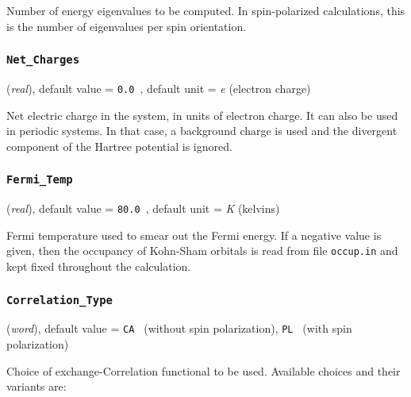 \documentclass{article}
\begin{document}
Number of energy eigenvalues to be computed. In spin-polarized calculations,
this is the number of eigenvalues per spin orientation.

\subsubsection{\tt Net\_Charges 
\label{NetCharges}}
({\it real}),
default value = {\tt 0.0 },
default unit = {\it e} (electron charge)

Net electric charge in the system, in units of electron charge. It can also
be used in periodic systems. In that case, a background charge is used
and the divergent component of the Hartree potential is ignored.

\subsubsection{\tt Fermi\_Temp 
\label{FermiTemp}}
({\it real}),
default value = {\tt 80.0 },
default unit = {\it K} (kelvins)

Fermi temperature used to smear out the Fermi energy. If a
negative value is given, then the occupancy of Kohn-Sham orbitals is read from
file {\tt occup.in} and kept fixed throughout the
calculation. 

\subsubsection{\tt Correlation\_Type 
\label{CorrelationType}}
({\it word}),
default value = {\tt CA } (without spin polarization), {\tt PL } (with
spin polarization)

Choice of exchange-Correlation functional to be used. Available
choices and their variants are:
\end{document}
